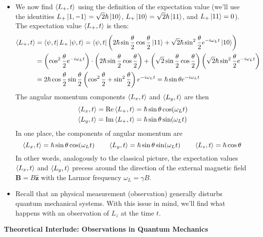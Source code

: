 \documentclass[11pt, a4paper]{article}
\renewcommand{\vec}[1]{\bm{#1}} %
\newcommand{\uvec}[1]{\hat{\vec{#1}}} %
\begin{document}
\begin{itemize}
	\item We now find $ \ev{L_{+}, t} $ using the definition of the expectation value (we'll use the identities $ L_{+}\ket{1, -1} = \sqrt{2}\hbar \ket{10} $, $ L_{+}\ket{10} = \sqrt{2}\hbar \ket{11} $, and $ L_{+}\ket{11} = 0 $). The expectation value $ \ev{L_{+}, t} $ is then:
	\begin{align*}
		\ev{L_{+}, t} &= \bra{\psi, t} L_{+}\ket{\psi, t} = \bra{\psi, t} \left(2 \hbar \sin \frac{\theta}{2} \cos \frac{\theta}{2}\ket{11} + \sqrt{2}\hbar \sin^{2}\frac{\theta}{2}e^{-i\omega_{L}t}\ket{10}\right)\\
		&=\left(\cos^{2}\frac{\theta}{2} e^{-i\omega_{L}t}\right)\cdot \left(2\hbar \sin\frac{\theta}{2}\cos\frac{\theta}{2}\right) + \left(\sqrt{2}\sin \frac{\theta}{2}\cos \frac{\theta}{2}\right)\left(\sqrt{2}\hbar\sin^{2}\frac{\theta}{2}e^{-i\omega_{L}t}\right)\\
		&=2\hbar\cos\frac{\theta}{2}\sin\frac{\theta}{2}\left(\cos^{2}\frac{\theta}{2} + \sin^{2}\frac{\theta}{2}\right)e^{-i\omega_{L}t}= \hbar \sin\theta e^{-i\omega_{L}t}
	\end{align*}
	The angular momentum components $ \ev{L_{x}, t} $ and $ \ev{L_{y}, t} $ are then
	\begin{align*}
		&\ev{L_{x}, t} = \Re \ev{L_{+}, t} = \hbar \sin \theta \cos( \omega_{L}t)\\
		& \ev{L_{y}, t} = \Im \ev{L_{+}, t} = \hbar \sin \theta \sin( \omega_{L}t)
	\end{align*}
	In one place, the components of angular momentum are
	\begin{equation*}
		\ev{L_{x}, t} = \hbar \sin \theta \cos( \omega_{L}t) \qquad 	\ev{L_{y}, t} = \hbar \sin \theta \sin( \omega_{L}t) \qquad 
		\ev{L_{z}, t} = \hbar \cos \theta
	\end{equation*}
	In other words, analogously to the classical picture, the expectation values $ \ev{L_{x}, t} $ and $ \ev{L_{y}, t} $ precess around the direction of the external magnetic field $ \vec{B} = B \uvec{z} $ with the Larmor frequency $ \omega_{L} = \gamma B $. 
	
	\item Recall that an physical measurement (observation) generally disturbs quantum mechanical systems. With this issue in mind, we'll find what happens with an observation of $ L_{z} $  at the time $ t $. 
	
\end{itemize}
\textbf{Theoretical Interlude: Observations in Quantum Mechanics}
\end{document}
